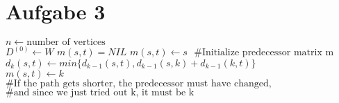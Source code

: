 \documentclass{article}
\begin{document}
\section*{Aufgabe 3}

\begin{algorithm}
\begin{algorithmic}[5]

\State $ n \gets \text{number of vertices}$ \\
\State $D^{(0)} \gets W$ 
\State $m(s,t) = NIL$
\Else  
\State $m(s,t) \gets s$
\State $\text{ \#Initialize predecessor matrix m}$
\EndIf
\EndFor
\EndFor
{}
\State $d_k(s,t) \gets min\{d_{k-1}(s,t), d_{k-1}(s,k) + d_{k-1}(k,t)\}$\\
\State $m(s,t) \gets k$ \\
\State $\text{\# If the path gets shorter, the predecessor must have changed,}$
\State $\text{\# and since we just tried out k, it must be k}$
\EndIf
\EndFor
\EndFor
\EndFor


\EndFunction

\end{algorithmic}
\end{algorithm}
\end{document}
